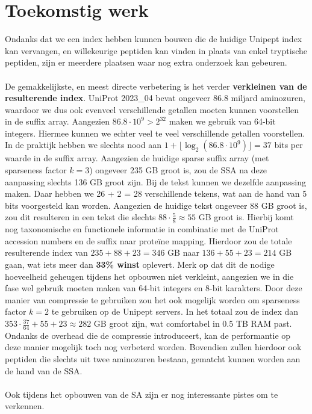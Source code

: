 \section{Toekomstig werk}
Ondanks dat we een index hebben kunnen bouwen die de huidige Unipept index kan vervangen, en willekeurige peptiden kan vinden in plaats van enkel tryptische peptiden, zijn er meerdere plaatsen waar nog extra onderzoek kan gebeuren.
\\ \\
De gemakkelijkste, en meest directe verbetering is het verder \textbf{verkleinen van de resulterende index}.
UniProt 2023\_04 bevat ongeveer 86.8 miljard aminozuren, waardoor we dus ook evenveel verschillende getallen moeten kunnen voorstellen in de suffix array.
Aangezien $86.8 \cdot 10^9 > 2^{32}$ maken we gebruik van 64-bit integers.
Hiermee kunnen we echter veel te veel verschillende getallen voorstellen.
In de praktijk hebben we slechts nood aan $1 + \lfloor \log_2(86.8 \cdot 10^9) \rfloor = 37$ bits per waarde in de suffix array.
Aangezien de huidige sparse suffix array (met sparseness factor $k = 3$) ongeveer 235 GB groot is, zou de SSA na deze aanpassing slechts 136 GB groot zijn.
Bij de tekst kunnen we dezelfde aanpassing maken.
Daar hebben we 26 + 2 = 28 verschillende tekens, wat aan de hand van 5 bits voorgesteld kan worden.
Aangezien de huidige tekst ongeveer 88 GB groot is, zou dit resulteren in een tekst die slechts $88 \cdot \frac{5}{8} \approx 55$ GB groot is.
Hierbij komt nog taxonomische en functionele informatie in combinatie met de UniProt accession numbers en de suffix naar proteïne mapping.
Hierdoor zou de totale resulterende index van $235 + 88 + 23 = 346$ GB naar $136 + 55 + 23 = 214$ GB gaan, wat iets meer dan \textbf{33\% winst} oplevert.
Merk op dat dit de nodige hoeveelheid geheugen tijdens het opbouwen niet verkleint, aangezien we in die fase wel gebruik moeten maken van 64-bit integers en 8-bit karakters.
Door deze manier van compressie te gebruiken zou het ook mogelijk worden om sparseness factor $k = 2$ te gebruiken op de Unipept servers.
In het totaal zou de index dan $353 \cdot \frac{37}{64} + 55 + 23 \approx 282$ GB groot zijn, wat comfortabel in 0.5 TB RAM past.
Ondanks de overhead die de compressie introduceert, kan de performantie op deze manier mogelijk toch nog verbeterd worden.
Bovendien zullen hierdoor ook peptiden die slechts uit twee aminozuren bestaan, gematcht kunnen worden aan de hand van de SSA\@.
\\ \\
Ook tijdens het opbouwen van de SA zijn er nog interessante pistes om te verkennen.
